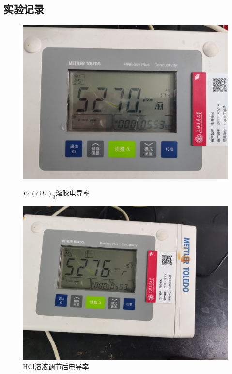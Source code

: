\documentclass[12pt,hyperref,a4paper,UTF8]{ctexart}
\begin{document}
\subsection{实验记录}
\begin{figure}[htp]
	\centering
	\begin{minipage}{0.45\linewidth}
		\centering
		\includegraphics[width=\linewidth]{WechatIMG604.jpg}
		\caption{$Fe(OH)_3$溶胶电导率}
		\label{fig:gel-conductivity}
	\end{minipage}\hfill
	\begin{minipage}{0.45\linewidth}
		\centering
		\includegraphics[width=\linewidth]{WechatIMG605.jpg}
		\caption{HCl溶液调节后电导率}
		\label{fig:hcl-conductivity}
	\end{minipage}
\end{figure}
\newpage
\end{document}
